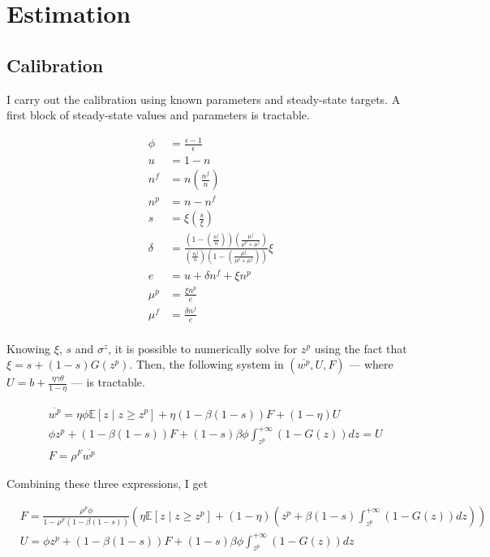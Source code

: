 
\section{Estimation}

\subsection{Calibration}

I carry out the calibration using known parameters and steady-state targets. A first block of steady-state values and parameters is tractable.

\begin{align*}
\phi &= \frac{\epsilon - 1}{\epsilon}\\
u &= 1-n\\
n^f &= n \left( \frac{n^f}{n} \right)\\
n^p &= n-n^f\\
s &= \xi\left(\frac{s}{\xi}\right)\\
\delta &= \frac{\left( 1 - \left( \frac{n^f}{n} \right) \right) \left( \frac{\mu^f}{\mu^p+\mu^f}\right)}{\left( \frac{n^f}{n} \right) \left( 1-\left( \frac{\mu^f}{\mu^p+\mu^f}\right)\right)} \xi\\
e &= u+\delta n^f + \xi n^p\\
\mu^p &= \frac{\xi n^p}{e}\\
\mu^f &= \frac{\delta n^f}{e}\\
\end{align*}

Knowing $\xi$, $s$ and $\sigma^z$, it is possible to numerically solve for $z^p$ using the fact that $\xi = s + (1-s) G\left( z^p \right)$. Then, the following system in $\left( \overline{w^p}, U, F \right)$ --- where $U = b + \frac{\eta \gamma \theta}{1-\eta}$ --- is tractable.

\begin{align*}
&\overline{w^p} = \eta \phi \mathbb{E} \left[ z \mid z \geq z^p \right] + \eta (1-\beta(1-s)) F + (1-\eta) U \\
&\phi z^p + \left( 1 - \beta (1-s) \right) F + (1-s)  \beta \phi \int_{z^p}^{+\infty} \left( 1 - G(z) \right) dz = U \\
&F = \rho^F \overline{w^p} 
\end{align*}

Combining these three expressions, I get

\begin{align*}
&F = \frac{\rho^F \phi}{1 - \rho^F (1 - \beta (1-s))} \left( \eta \mathbb{E} \left[ z \mid z \geq z^p \right] + (1-\eta) \left( z^p + \beta (1-s) \int_{z^p}^{+\infty} \left( 1 - G(z) \right) dz \right) \right)\\
&U = \phi z^p + \left( 1 - \beta (1-s) \right) F + (1-s)  \beta \phi \int_{z^p}^{+\infty} \left( 1 - G(z) \right) dz
\end{align*}


